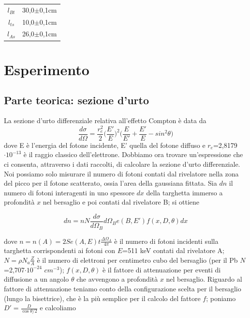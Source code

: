 \documentclass[italian,11pt]{report}
\begin{document}
\begin{center}
    \centering
    \begin{tabular}{cc}
    \hline\hline
    $l_{Bt}$ & 30,0$\pm$0,1cm\\
    $l_{ts}$ & 10,0$\pm$0,1cm\\
    $l_{As}$ & 26,0$\pm$0,1cm\\
    \hline\hline
    \end{tabular}
    \end{center}
    
\chapter{Esperimento}
\section{Parte teorica: sezione d'urto}
La sezione d'urto differenziale relativa all'effetto Compton è data da
\begin{equation}
\frac{d\sigma}{d\Omega}=\frac{r^2_{e}}{2}\Biggl(\frac{E'}{E}\Biggl)^2\Biggl(\frac{E}{E'}+\frac{E'}{E}-sin^2\theta\Biggl)
\end{equation}
dove E è l'energia del fotone incidente, E' quella del fotone diffuso e $r_{e}$=2,8179$\cdot10^{-13}$ è il raggio classico dell'elettrone. \newline Dobbiamo ora trovare un'espressione che ci consenta, attraverso i dati raccolti, di calcolare la sezione d'urto differenziale. Noi possiamo solo misurare il numero di fotoni contati dal rivelatore nella zona del picco per il fotone scatterato, ossia l'area della gaussiana fittata. 
Sia ${dn}$ il numero di fotoni interagenti in uno spessore ${dx}$ della targhetta immerso a profondità ${x}$ nel bersaglio e poi contati dal rivelatore B; si ottiene

\begin{equation}
dn=nN\frac{d\sigma}{d\Omega_B}d\Omega_Be(B,E')f(x,D,\theta)dx
\end{equation}

dove $n=n(A)=2Se(A,E)t\frac{\Delta\Omega_A}{4\pi}$ è il numero di fotoni incidenti sulla targhetta corrispondenti ai fotoni con $E$=511 keV contati dal rivelatore A; $N=\rho N_a \frac{Z}{A}$ è il numero di elettroni per centimetro cubo del bersaglio (per il Pb $N$=2,707$\cdot10^{-24}$ $cm^{-3}$); $f(x,D,\theta)$ è il fattore di attenuazione per eventi di diffusione a un angolo $\theta$ che avvengono a profondità $x$ nel bersaglio. 
Riguardo al fattore di attenuazione teniamo conto della configurazione scelta per il bersaglio (lungo la bisettrice), che è la più semplice per il calcolo del fattore $f$; poniamo $D'=\frac{D}{\cos{\theta/2}}$ e calcoliamo 
\end{document}
